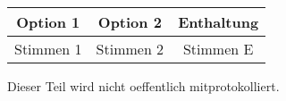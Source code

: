 \documentclass[
    gremium=FSR, %
    english,      %
    wideoverview, %
]{fs-protokoll}
\begin{document}
\begin{center}
\begin{tabular}{c|c|c} 
    \textbf{Option 1} & \textbf{Option 2} & \textbf{Enthaltung}\\ \hline 
     Stimmen 1 & Stimmen 2 & Stimmen E
\end{tabular}
\end{center}

\begin{nichtoeff}
	Dieser Teil wird nicht oeffentlich mitprotokolliert. 
\end{nichtoeff}


\end{document}
